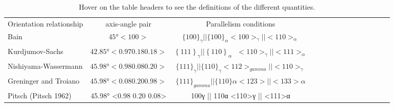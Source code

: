 
\begin{table*}
\caption{Hover on the table headers to see the definitions of the  different quantities.}
\label{table}
\begin{tabular}{l c | c c c c c c  c c c c c c}
\hline\hline
    Orientation relationship & axis-angle pair & Parallelism conditions \\
    Bain \cite{bain1924nature} & \(45°<100>\) & $\{100\}_{\gamma} || \{100\}_{\alpha} <100>_{\gamma } || <110>_{\alpha}$ \\
    Kurdjumov-Sachs \cite{kurdjumow1930mechanismus} & \(42.85°<0.970.180.18>\) & $\left\{111\right\}_{\gamma}||\left\{110\right\}_{\alpha}\ \ \ <110>_{\gamma}||<111>_{\alpha}$ \\
    Nishiyama-Wassermann\cite{nishiyama1934x,wassermann1935ueber} & $45.98° <0.98 0.08 0.20>$ & $\{111\}_{\gamma} || \{110\}_{\gamma} <112>_{gamma} || <110>_{\gamma}$ \\
    Greninger and Troiano\cite{greninger1949mechanism} & $45.98° <0.08 0.20 0.98>$ & $\{111\}_{gamma} || \{110\}α <123> || <133>α$ \\
    Pitsch (Pitsch 1962) & 45.98° <0.98 0.20 0.08> & {100}γ || {110}α <110>γ || <111>α \\
\hline
\end{tabular}
\end{table*}
